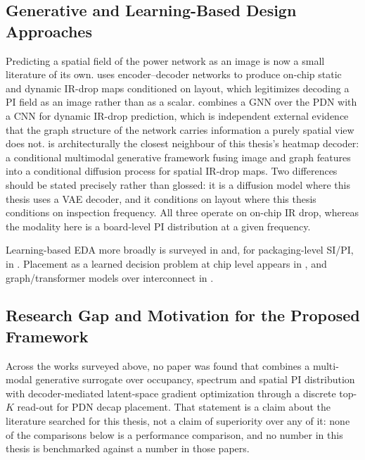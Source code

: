 \subsection{Generative and Learning-Based Design Approaches}
\label{subsec:generative_learning_approaches}

Predicting a spatial field of the power network as an image is now a small
literature of its own. \cite{chhabria2021iredge} uses encoder--decoder networks
to produce on-chip static and dynamic IR-drop maps conditioned on layout,
which legitimizes decoding a PI field as an image rather than as a scalar.
\cite{zhao2024pdnnet} combines a GNN over the PDN with a CNN for dynamic IR-drop
prediction, which is independent external evidence that the graph structure of
the network carries information a purely spatial view does not.
\cite{gif2026conditional} is architecturally the closest neighbour of this
thesis's heatmap decoder: a conditional multimodal generative framework fusing
image and graph features into a conditional diffusion process for spatial IR-drop
maps. Two differences should be stated precisely rather than glossed: it is a
diffusion model where this thesis uses a VAE decoder, and it conditions on
layout where this thesis conditions on inspection frequency. All three operate on
on-chip IR drop, whereas the modality here is a board-level PI distribution at a
given frequency.

Learning-based EDA more broadly is surveyed in \cite{huang2021ml} and, for
packaging-level SI/PI, in \cite{swaminathan2020demystifying}. Placement as a
learned decision problem at chip level appears in \cite{mirhoseini2021chip}, and
graph/transformer models over interconnect in \cite{traceformer2024graph}.

\subsection{Research Gap and Motivation for the Proposed Framework}
\label{subsec:research_gap}

Across the works surveyed above, no paper was found that combines a multi-modal
generative surrogate over occupancy, spectrum and spatial PI distribution with
decoder-mediated latent-space gradient optimization through a discrete top-$K$
read-out for PDN decap placement. That statement is a claim about the literature
searched for this thesis, not a claim of superiority over any of it: none of the
comparisons below is a performance comparison, and no number in this thesis is
benchmarked against a number in those papers.

